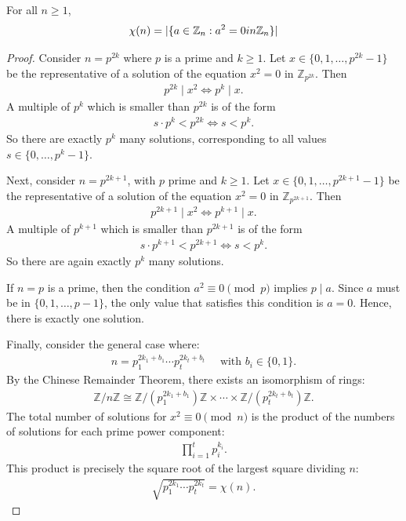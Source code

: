 \documentclass[10pt,a4paper]{amsart}
\newcommand{\Z}{\mathbb{Z}}
\begin{document}
\begin{theorem}\label{modeqchi}
    For all $n \geq 1$,
    $$\chi(n) = |\{ a \in \mathbb Z_n : a^2 = 0 \textup{  in } \mathbb Z_n \} |$$
\end{theorem}

\begin{proof}
Consider $n = p^{2k}$ where $p$ is a prime and $k \geq 1$.
Let $x \in \{0, 1, \dots, p^{2k} - 1\}$ be the representative of a solution of the equation $x^2 = 0$ in $\mathbb Z_{p^{2k}}$.
Then
\begin{align*}
   p^{2k} \mid x^2 \iff p^k \mid x .
\end{align*}
A multiple of $p^k$ which is smaller than $p^{2k}$ is of the form
\begin{align*}
s \cdot p^k < p^{2k} \iff s < p^k.
\end{align*}
So there are exactly $p^k$ many solutions, corresponding to all values $s \in \{0, \dots, p^k-1\}$.

Next, consider $n = p^{2k + 1}$, with $p$ prime and $k \geq 1$. Let $x \in \{0, 1, \dots, p^{2k + 1} - 1\}$ be the representative of a solution of the equation $x^2 = 0$ in $\mathbb Z_{p^{2k + 1}}$.
Then
\begin{align*}
    p^{2k+1} \mid x^2 \iff p^{k + 1} \mid x .
\end{align*}
A multiple of $p^{k + 1}$ which is smaller than $p^{2k + 1}$ is of the form
\begin{align*}
s \cdot p^{k + 1} < p^{2k+1} \iff s < p^k .
\end{align*}
So there are again exactly $p^k$ many solutions.

If $n = p$ is a prime, then the condition $a^2 \equiv 0 \pmod{p}$ implies $p \mid a$. Since $a$ must be in $\{0, 1, \dots, p - 1\}$, the only value that satisfies this condition is $a = 0$. Hence, there is exactly one solution.

Finally, consider the general case where:
\begin{align*}
n = p_1^{2k_1 + b_1} \cdots p_t^{2k_t + b_t} \quad \text{ with } b_i \in \{0, 1\}.
\end{align*}
By the Chinese Remainder Theorem, there exists an isomorphism of rings:
\begin{align*}
\Z/n\Z \cong \Z/(p_1^{2k_1 + b_1})\Z \times \cdots \times \Z/(p_t^{2k_t + b_t})\Z.
\end{align*}
The total number of solutions for $x^2 \equiv 0 \pmod{n}$ is the product of the numbers of solutions for each prime power component:
\begin{align*}
\prod_{i=1}^t p_i^{k_i}.
\end{align*}
This product is precisely the square root of the largest square dividing $n$:
\begin{align*}
\sqrt{p_1^{2k_1} \cdots p_t^{2k_t}} = \chi(n).
\end{align*}
\end{proof}
\end{document}
